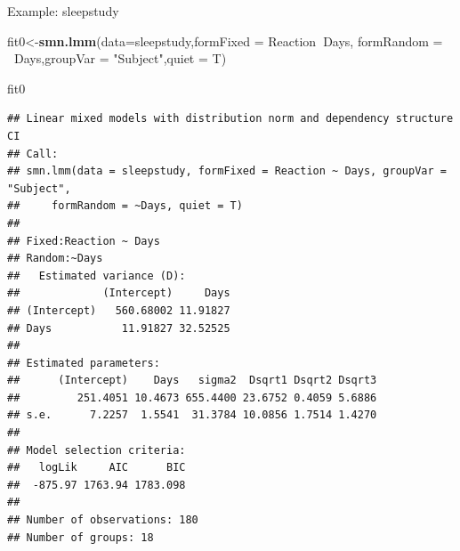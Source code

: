 \documentclass[
  ignorenonframetext,
]{beamer}
\newenvironment{Shaded}{\begin{snugshade}}{\end{snugshade}}
\newcommand{\DataTypeTok}[1]{\textcolor[rgb]{0.13,0.29,0.53}{#1}}
\newcommand{\KeywordTok}[1]{\textcolor[rgb]{0.13,0.29,0.53}{\textbf{#1}}}
\newcommand{\NormalTok}[1]{#1}
\newcommand{\OperatorTok}[1]{\textcolor[rgb]{0.81,0.36,0.00}{\textbf{#1}}}
\newcommand{\StringTok}[1]{\textcolor[rgb]{0.31,0.60,0.02}{#1}}
\begin{document}
\begin{frame}[fragile]{Example: sleepstudy}
\protect\hypertarget{example-sleepstudy}{}

\tiny

\begin{Shaded}
\begin{Highlighting}[]
\NormalTok{fit0<-}\KeywordTok{smn.lmm}\NormalTok{(}\DataTypeTok{data=}\NormalTok{sleepstudy,}\DataTypeTok{formFixed =}\NormalTok{ Reaction}\OperatorTok{~}\NormalTok{Days,}
              \DataTypeTok{formRandom =} \OperatorTok{~}\NormalTok{Days,}\DataTypeTok{groupVar =} \StringTok{"Subject"}\NormalTok{,}\DataTypeTok{quiet =}\NormalTok{ T)}
\end{Highlighting}
\end{Shaded}

\begin{Shaded}
\begin{Highlighting}[]
\NormalTok{fit0}
\end{Highlighting}
\end{Shaded}

\begin{verbatim}
## Linear mixed models with distribution norm and dependency structure CI 
## Call:
## smn.lmm(data = sleepstudy, formFixed = Reaction ~ Days, groupVar = "Subject", 
##     formRandom = ~Days, quiet = T)
## 
## Fixed:Reaction ~ Days
## Random:~Days
##   Estimated variance (D):
##             (Intercept)     Days
## (Intercept)   560.68002 11.91827
## Days           11.91827 32.52525
## 
## Estimated parameters:
##      (Intercept)    Days   sigma2  Dsqrt1 Dsqrt2 Dsqrt3
##         251.4051 10.4673 655.4400 23.6752 0.4059 5.6886
## s.e.      7.2257  1.5541  31.3784 10.0856 1.7514 1.4270
## 
## Model selection criteria:
##   logLik     AIC      BIC
##  -875.97 1763.94 1783.098
## 
## Number of observations: 180 
## Number of groups: 18
\end{verbatim}

\end{frame}
\end{document}
